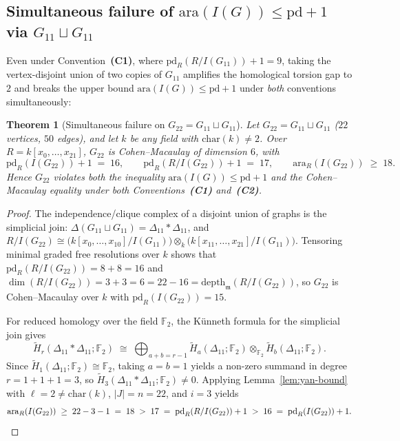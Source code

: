 \documentclass[11pt,a4paper]{amsart}
\theoremstyle{plain}
\newtheorem{theorem}{Theorem}[section]
\theoremstyle{definition}
\newcommand{\ara}{\mathrm{ara}}
\newcommand{\pd}{\mathrm{pd}}
\newcommand{\depth}{\mathrm{depth}}
\newcommand{\FF}{\mathbb{F}}
\newcommand{\mm}{\mathfrak{m}}
\begin{document}
\subsection{Simultaneous failure of \texorpdfstring{$\ara(I(G)) \le \pd + 1$}{ara(I(G)) <= pd + 1} via \texorpdfstring{$G_{11} \sqcup G_{11}$}{G11 U G11}}

Even under Convention~\textbf{(C1)}, where $\pd_R(R/I(G_{11})) + 1 = 9$, taking the vertex-disjoint union of two copies of $G_{11}$ amplifies the homological torsion gap to $2$ and breaks the upper bound $\ara(I(G)) \le \pd + 1$ under \emph{both} conventions simultaneously:

\begin{theorem}[Simultaneous failure on $G_{22} = G_{11} \sqcup G_{11}$]\label{thm:g22}
Let $G_{22} = G_{11} \sqcup G_{11}$ ($22$ vertices, $50$ edges), and let $k$ be any field with $\mathrm{char}(k) \neq 2$. Over $R = k[x_0,\dots,x_{21}]$, $G_{22}$ is Cohen--Macaulay of dimension $6$, with
\[
  \pd_R(I(G_{22})) + 1 \;=\; 16, \qquad
  \pd_R(R/I(G_{22})) + 1 \;=\; 17, \qquad
  \ara_R(I(G_{22})) \;\ge\; 18.
\]
Hence $G_{22}$ violates \emph{both} the inequality $\ara(I(G)) \le \pd + 1$ and the Cohen--Macaulay equality under \emph{both} Conventions~\textbf{(C1)} and~\textbf{(C2)}.
\end{theorem}

\begin{proof}
The independence/clique complex of a disjoint union of graphs is the simplicial join: $\Delta(G_{11} \sqcup G_{11}) = \Delta_{11} * \Delta_{11}$, and $R/I(G_{22}) \cong \bigl(k[x_0,\dots,x_{10}]/I(G_{11})\bigr) \otimes_k \bigl(k[x_{11},\dots,x_{21}]/I(G_{11})\bigr)$. Tensoring minimal graded free resolutions over $k$ shows that $\pd_R(R/I(G_{22})) = 8 + 8 = 16$ and $\dim(R/I(G_{22})) = 3 + 3 = 6 = 22 - 16 = \depth_{\mm}(R/I(G_{22}))$, so $G_{22}$ is Cohen--Macaulay over $k$ with $\pd_R(I(G_{22})) = 15$.

For reduced homology over the field $\FF_2$, the K\"unneth formula for the simplicial join gives
\[
  \widetilde{H}_r(\Delta_{11} * \Delta_{11}; \FF_2) \;\cong\; \bigoplus_{a + b = r - 1} \widetilde{H}_a(\Delta_{11}; \FF_2) \otimes_{\FF_2} \widetilde{H}_b(\Delta_{11}; \FF_2).
\]
Since $\widetilde{H}_1(\Delta_{11}; \FF_2) \cong \FF_2$, taking $a = b = 1$ yields a non-zero summand in degree $r = 1 + 1 + 1 = 3$, so $\widetilde{H}_3(\Delta_{11} * \Delta_{11}; \FF_2) \neq 0$. Applying Lemma~\ref{lem:yan-bound} with $\ell = 2 \neq \mathrm{char}(k)$, $|J| = n = 22$, and $i = 3$ yields
\[
  \ara_R(I(G_{22})) \;\ge\; 22 - 3 - 1 \;=\; 18 \;>\; 17 \;=\; \pd_R(R/I(G_{22})) + 1 \;>\; 16 \;=\; \pd_R(I(G_{22})) + 1. \qedhere
\]
\end{proof}
\end{document}
